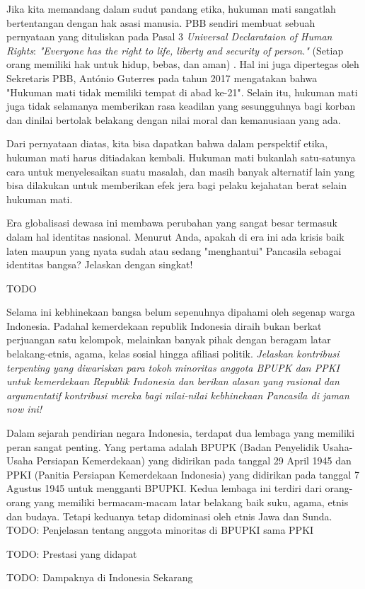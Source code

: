 \documentclass[
  12pt,
  answers  
]{exam}
\begin{document}
\begin{questions}
\begin{solution}
        Jika kita memandang dalam sudut pandang etika, hukuman mati sangatlah bertentangan dengan hak asasi manusia. PBB sendiri membuat sebuah pernyataan yang dituliskan pada Pasal 3 \emph{Universal Declarataion of Human Rights}: \emph{"Everyone has the right to life, liberty and security of person."} (Setiap orang memiliki hak untuk hidup, bebas, dan aman) \cite{nationsUniversalDeclarationHuman}. Hal ini juga dipertegas oleh Sekretaris PBB, António Guterres pada tahun 2017 mengatakan bahwa "Hukuman mati tidak memiliki tempat di abad ke-21"\cite{DeathPenaltyHas2017}. Selain itu, hukuman mati juga tidak selamanya memberikan rasa keadilan yang sesungguhnya bagi korban dan dinilai bertolak belakang dengan nilai moral dan kemanusiaan yang ada. 

        Dari pernyataan diatas, kita bisa dapatkan bahwa dalam perspektif etika, hukuman mati harus ditiadakan kembali. Hukuman mati bukanlah satu-satunya cara untuk menyelesaikan suatu masalah, dan masih banyak alternatif lain yang bisa dilakukan untuk memberikan efek jera bagi pelaku kejahatan berat selain hukuman mati. 
      \end{solution}

      \question
      Era globalisasi dewasa ini membawa perubahan yang sangat besar termasuk dalam hal identitas nasional. Menurut Anda, apakah di era ini ada krisis baik laten maupun yang nyata sudah atau sedang "menghantui" Pancasila sebagai identitas bangsa? Jelaskan dengan singkat!
      \begin{solution}
        TODO
      \end{solution}

      \question
      Selama ini kebhinekaan bangsa belum sepenuhnya dipahami oleh segenap warga Indonesia. Padahal kemerdekaan republik Indonesia diraih bukan berkat perjuangan satu kelompok, melainkan banyak pihak dengan beragam latar belakang-etnis, agama, kelas sosial hingga afiliasi politik. \emph{Jelaskan kontribusi terpenting yang diwariskan para tokoh minoritas anggota BPUPK dan PPKI untuk kemerdekaan Republik Indonesia dan berikan alasan yang rasional dan argumentatif kontribusi mereka bagi nilai-nilai kebhinekaan Pancasila di jaman now ini!}     
      \begin{solution}
        Dalam sejarah pendirian negara Indonesia, terdapat dua lembaga yang memiliki peran sangat penting. Yang pertama adalah BPUPK (Badan Penyelidik Usaha-Usaha Persiapan Kemerdekaan) yang didirikan pada tanggal 29 April 1945 dan PPKI (Panitia Persiapan Kemerdekaan Indonesia) yang didirikan pada tanggal 7 Agustus 1945 untuk mengganti BPUPKI. Kedua lembaga ini terdiri dari orang-orang yang memiliki bermacam-macam latar belakang baik suku, agama, etnis dan budaya. Tetapi keduanya tetap didominasi oleh etnis Jawa dan Sunda. TODO: Penjelasan tentang anggota minoritas di BPUPKI sama PPKI

        TODO: Prestasi yang didapat

        TODO: Dampaknya di Indonesia Sekarang

      \end{solution}
    \end{questions}

    \pagebreak

    
    

		
\end{document}
